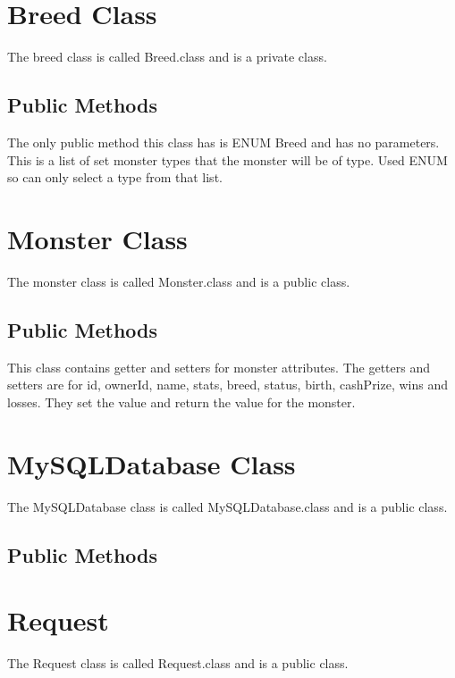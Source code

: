 \documentclass{project}
\begin{document}
\section{Breed Class}
The breed class is called Breed.class and is a private class.
\subsection{Public Methods} 
The only public method this class has is ENUM Breed and has no parameters. This is a list of set monster types that the monster will be of type. Used ENUM so can only select a type from that list.

\section{Monster Class}
The monster class is called Monster.class and is a public class.
\subsection{Public Methods}
This class contains getter and setters for monster attributes. The getters and setters are for id, ownerId, name, stats, breed, status, birth, cashPrize, wins and losses. They set the value and return the value for the monster.

\section{MySQLDatabase Class}
The MySQLDatabase class is called MySQLDatabase.class and is a public class.
\subsection{Public Methods}


\section{Request}
The Request class is called Request.class and is a public class.
\end{document}
